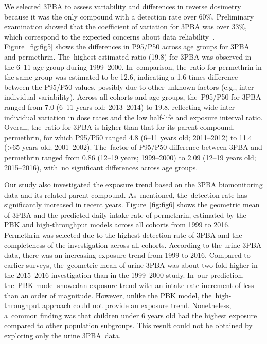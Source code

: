 \documentclass[toxics,article,accept,pdftex,moreauthors]{Definitions/mdpi}
\begin{document}
We selected 3PBA to assess variability and differences in reverse
dosimetry because it was the only compound with a detection rate over
60\%. Preliminary examination showed that the coefficient of variation
for 3PBA was over 33\%, which correspond to the expected concerns about
data reliability~\citep{faure_evaluation_2020}. Figure~\ref{fig:fig5}
shows the differences in P95/P50 across age groups for 3PBA and
permethrin. The~highest estimated ratio (19.8) for 3PBA was observed in
the 6--11 age group during 1999--2000. In~comparison, the~ratio for
permethrin in the same group was estimated to be 12.6, indicating a
1.6 times difference between the P95/P50 values, possibly due to other
unknown factors (e.g., inter-individual variability). Across all cohorts
and age groups, the~P95/P50 for 3PBA ranged from 7.0 (6--11 years old;
2013--2014) to 19.8, reflecting wide inter-individual variation in dose
rates and the low half-life and exposure interval ratio. Overall, the~ratio for 3PBA is higher than that for its parent compound, permethrin,
for which P95/P50 ranged 4.8 (6--11 years old; 2011--2012) to 11.4 (\textgreater65
years old; 2001--2002). The~factor of P95/P50 difference between 3PBA and
permethrin ranged from 0.86 (12--19 years; 1999--2000) to 2.09
(12--19 years old; 2015--2016), with~no significant differences across age
groups.

Our study also investigated the exposure trend based on the 3PBA
biomonitoring data and its related parent compound. As~mentioned, the~detection rate has significantly increased in recent years.
Figure~\ref{fig:fig6} shows the geometric mean of 3PBA and the predicted daily
intake rate of permethrin, estimated by the PBK and high-throughput
models across all cohorts from 1999 to 2016. Permethrin was selected due
to the highest detection rate of 3PBA and the completeness of the
investigation across all cohorts. According to the urine 3PBA data,
there was an increasing exposure trend from 1999 to 2016. Compared to
earlier surveys, the~geometric mean of urine 3PBA was about two-fold
higher in the 2015--2016 investigation than in the 1999--2000 study. In~our
prediction, the~PBK model showedan exposure trend with an intake rate
increment of less than an order of magnitude. However, unlike the PBK
model, the~high-throughput approach could not provide an exposure trend.
Nonetheless, a~common finding was that children under 6 years old had
the highest exposure compared to other population subgroups. This result
could not be obtained by exploring only the urine 3PBA~data.
\end{document}
